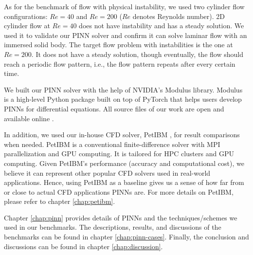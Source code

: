 As for the benchmark of flow with physical instability, we used two cylinder flow configurations: $Re=40$ and $Re=200$ ($Re$ denotes Reynolds number).
2D cylinder flow at $Re=40$ does not have instability and has a steady solution.
We used it to validate our PINN solver and confirm it can solve laminar flow with an immersed solid body.
The target flow problem with instabilities is the one at $Re=200$.
It does not have a steady solution, though eventually, the flow should reach a periodic flow pattern, i.e., the flow pattern repeats after every certain time.

We built our PINN solver with the help of NVIDIA's Modulus library.
Modulus is a high-level Python package built on top of PyTorch that helps users develop PINNs for differential equations.
All source files of our work are open and available online \cite{chuang_dissertation_nodate}.

In addition, we used our in-house CFD solver, PetIBM \cite{chuang_petibm:_2018}, for result comparisons when needed.
PetIBM is a conventional finite-difference solver with MPI parallelization and GPU computing.
It is tailored for HPC clusters and GPU computing.
Given PetIBM's performance (accuracy and computational cost), we believe it can represent other popular CFD solvers used in real-world applications.
Hence, using PetIBM as a baseline gives us a sense of how far from or close to actual CFD applications PINNs are.
For more details on PetIBM, please refer to chapter \ref{chap:petibm}.

Chapter \ref{chap:pinn} provides details of PINNs and the techniques/schemes we used in our benchmarks.
The descriptions, results, and discussions of the benchmarks can be found in chapter \ref{chap:pinn-cases}.
Finally, the conclusion and discussions can be found in chapter \ref{chap:discussion}.

